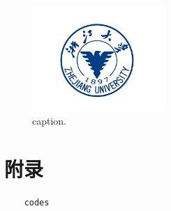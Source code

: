 \documentclass[oneside,a4paper]{article}
\begin{document}
\begin{figure}[!htbp]
    \centering
    \includegraphics[width=0.45\textwidth]{figure.png}
    \caption{caption.}
    \label{fig_sim_1}
\end{figure}

\newpage



\newpage

\appendix
\renewcommand\thesection{\Alph{section}}

\section{附录}

\begin{lstlisting}
    codes
\end{lstlisting}
\end{document}
